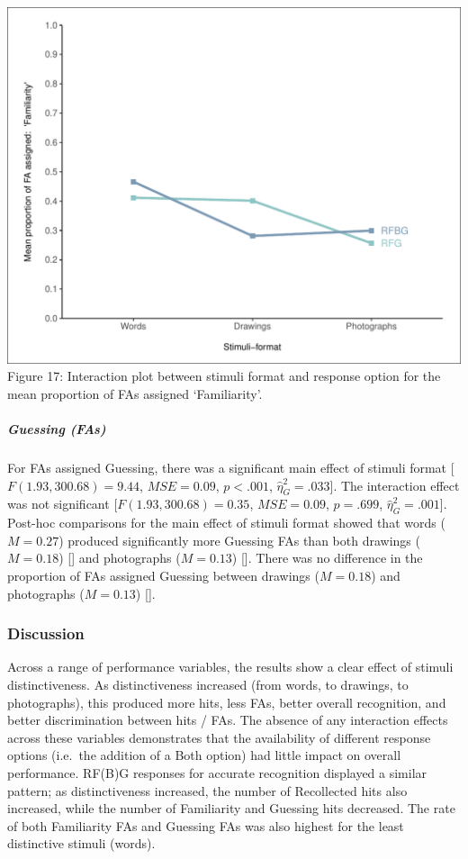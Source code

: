 \documentclass[
  11pt,
]{article}
\begin{document}
\includegraphics{R--Thesis_files/figure-latex/unnamed-chunk-43-1.pdf}
Figure 17: Interaction plot between stimuli format and response option
for the mean proportion of FAs assigned `Familiarity'.

\hypertarget{guessing-fas}{%
\subparagraph{Guessing (FAs)}\label{guessing-fas}}

For FAs assigned Guessing, there was a significant main effect of
stimuli format {[}\(F(1.93, 300.68) = 9.44\), \(\mathit{MSE} = 0.09\),
\(p < .001\), \(\hat{\eta}^2_G = .033\){]}. The interaction effect was
not significant {[}\(F(1.93, 300.68) = 0.35\), \(\mathit{MSE} = 0.09\),
\(p = .699\), \(\hat{\eta}^2_G = .001\){]}. Post-hoc comparisons for the
main effect of stimuli format showed that words (\(M = 0.27\)) produced
significantly more Guessing FAs than both drawings (\(M = 0.18\)) {[}{]}
and photographs (\(M = 0.13\)) {[}{]}. There was no difference in the
proportion of FAs assigned Guessing between drawings (\(M = 0.18\)) and
photographs (\(M = 0.13\)) {[}{]}.

\hypertarget{discussion-2}{%
\subsubsection{Discussion}\label{discussion-2}}

Across a range of performance variables, the results show a clear effect
of stimuli distinctiveness. As distinctiveness increased (from words, to
drawings, to photographs), this produced more hits, less FAs, better
overall recognition, and better discrimination between hits / FAs. The
absence of any interaction effects across these variables demonstrates
that the availability of different response options (i.e.~the addition
of a Both option) had little impact on overall performance. RF(B)G
responses for accurate recognition displayed a similar pattern; as
distinctiveness increased, the number of Recollected hits also
increased, while the number of Familiarity and Guessing hits decreased.
The rate of both Familiarity FAs and Guessing FAs was also highest for
the least distinctive stimuli (words).
\end{document}

